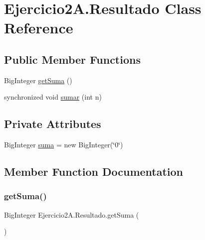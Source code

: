 \hypertarget{class_ejercicio2_a_1_1_resultado}{}\section{Ejercicio2\+A.\+Resultado Class Reference}
\label{class_ejercicio2_a_1_1_resultado}
\subsection*{Public Member Functions}
\begin{DoxyCompactItemize}
\item 
Big\+Integer \mbox{\hyperlink{class_ejercicio2_a_1_1_resultado_a7f40291e0fe95ed433499773da60440d}{get\+Suma}} ()
\item 
synchronized void \mbox{\hyperlink{class_ejercicio2_a_1_1_resultado_a72ea26b269e45dcf10697761fd351d76}{sumar}} (int n)
\end{DoxyCompactItemize}
\subsection*{Private Attributes}
\begin{DoxyCompactItemize}
\item 
Big\+Integer \mbox{\hyperlink{class_ejercicio2_a_1_1_resultado_ad684a9a7e4f55ef6862c6d1234259866}{suma}} = new Big\+Integer(\char`\"{}0\char`\"{})
\end{DoxyCompactItemize}


\subsection{Member Function Documentation}
\mbox{\label{class_ejercicio2_a_1_1_resultado_a7f40291e0fe95ed433499773da60440d}} 
\subsubsection{\texorpdfstring{get\+Suma()}{getSuma()}}
{\footnotesize\ttfamily Big\+Integer Ejercicio2\+A.\+Resultado.\+get\+Suma (\begin{DoxyParamCaption}{ }\end{DoxyParamCaption})\hspace{0.3cm}{\ttfamily [inline]}}


